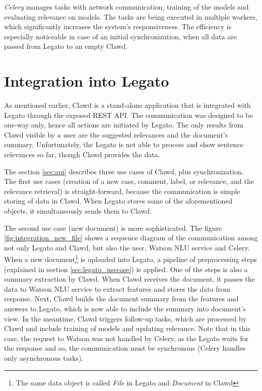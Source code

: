 \documentclass[
  digital, %
  notable,   %
  nolof,     %
  nolot,     %
]{fithesis3}
\begin{document}
\textit{Celery} manages tasks with network communication, training of the models and evaluating relevance on models.
The tasks are being executed in multiple workers, which significantly increases the system's responsiveness.
The efficiency is especially noticeable in case of an initial synchronization, when all data are passed from Legato to an empty Clawd.


\section{Integration into Legato}
As mentioned earlier, Clawd is a stand-alone application that is integrated with Legato through the exposed REST API.
The communication was designed to be one-way only, hence all actions are initiated by Legato.
The only results from Clawd visible by a user are the suggested relevances and the document's summary.
Unfortunately, the Legato is not able to process and show sentence relevances so far, though Clawd provides the data.

The section \ref{sec:api} describes three use cases of Clawd, plus synchronization.
The first use cases (creation of a new case, comment, label, or relevance, and the relevance retrieval) is straight-forward, because the communication is simple storing of data in Clawd.
When Legato stores some of the aforementioned objects, it simultaneously sends them to Clawd.

The second use case (new document) is more sophisticated.
The figure \ref{fig:integration_new_file} shows a sequence diagram of the communication among not only Legato and Clawd, but also the user, Watson NLU service and Celery.
When a new document\footnote{The same data object is called \textit{File} in Legato and \textit{Document} in Clawd} is uploaded into Legato, a pipeline of preprocessing steps (explained in section \ref{sec:legato_usecase}) is applied.
One of the steps is also a summary extraction by Clawd.
When Clawd receives the document, it passes the data to Watson NLU service to extract features and stores the data from response.
Next, Clawd builds the document summary from the features and answers to Legato, which is now able to include the summary into document's view.
In the meantime, Clawd triggers follow-up tasks, which are processed by Clawd and include training of models and updating relevance.
Note that in this case, the request to Watson was not handled by Celery, as the Legato waits for the response and so, the communication must be synchronous (Celery handles only asynchronous tasks).
\end{document}
